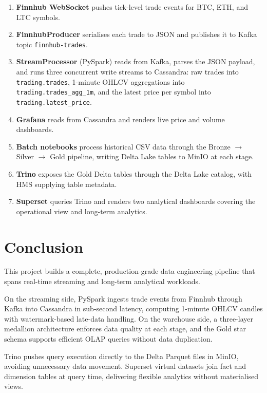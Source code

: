 \documentclass[a4paper]{article}
\begin{document}
\begin{enumerate}
    \item \textbf{Finnhub WebSocket} pushes tick-level trade events for BTC,
    ETH, and LTC symbols.
    \item \textbf{FinnhubProducer} serialises each trade to JSON and publishes
    it to Kafka topic \texttt{finnhub-trades}.
    \item \textbf{StreamProcessor} (PySpark) reads from Kafka, parses the JSON
    payload, and runs three concurrent write streams to Cassandra: raw trades
    into \texttt{trading.trades}, 1-minute OHLCV aggregations into
    \texttt{trading.trades\_agg\_1m}, and the latest price per symbol into
    \texttt{trading.latest\_price}.
    \item \textbf{Grafana} reads from Cassandra and renders live price and
    volume dashboards.
    \item \textbf{Batch notebooks} process historical CSV data through the
    Bronze $\rightarrow$ Silver $\rightarrow$ Gold pipeline, writing Delta Lake
    tables to MinIO at each stage.
    \item \textbf{Trino} exposes the Gold Delta tables through the Delta Lake
    catalog, with HMS supplying table metadata.
    \item \textbf{Superset} queries Trino and renders two analytical dashboards
    covering the operational view and long-term analytics.
\end{enumerate}

\section{Conclusion}

This project builds a complete, production-grade data engineering pipeline that
spans real-time streaming and long-term analytical workloads.

On the streaming side, PySpark ingests trade events from Finnhub through Kafka
into Cassandra in sub-second latency, computing 1-minute OHLCV candles with
watermark-based late-data handling. On the warehouse side, a three-layer
medallion architecture enforces data quality at each stage, and the Gold star
schema supports efficient OLAP queries without data duplication.

Trino pushes query execution directly to the Delta Parquet files in MinIO,
avoiding unnecessary data movement. Superset virtual datasets join fact and
dimension tables at query time, delivering flexible analytics without
materialised views.
\end{document}
